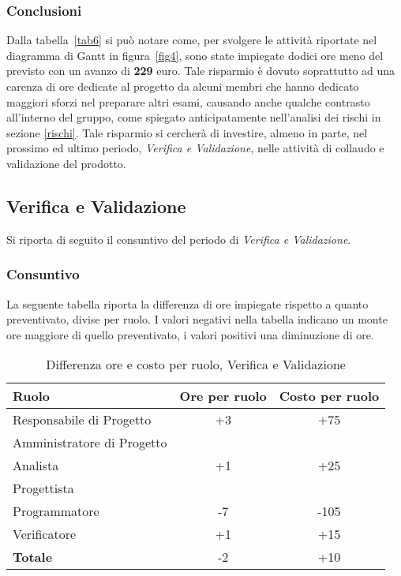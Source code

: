 \subsubsection{Conclusioni}
Dalla tabella~\ref{tab6} si può notare come, per svolgere le attività riportate nel diagramma di \gls{Gantt} in figura~\ref{fig4}, sono state impiegate dodici ore meno del previsto con un avanzo di \textbf{229} euro. Tale risparmio è dovuto soprattutto ad una carenza di ore dedicate al progetto da alcuni membri che hanno dedicato maggiori sforzi nel preparare altri esami, causando anche qualche contrasto all'interno del gruppo, come spiegato anticipatamente nell'analisi dei rischi in sezione \ref{rischi}. Tale risparmio si cercherà di investire, almeno in parte, nel prossimo ed ultimo periodo, \textit{Verifica e Validazione}, nelle attività di collaudo e validazione del prodotto. 

\newpage
\subsection{Verifica e Validazione}
Si riporta di seguito il consuntivo del periodo di \textit{Verifica e Validazione}.

\subsubsection{Consuntivo}
La seguente tabella riporta la differenza di ore impiegate rispetto a quanto preventivato, divise per ruolo. I valori negativi nella tabella indicano un monte ore maggiore di quello preventivato, i valori positivi una diminuzione di ore.

\begin{table}[h]
	\centering
	\begin{tabular}{|l|c|c|}
		\toprule
		\textbf{Ruolo} & \textbf{Ore per ruolo} & \textbf{Costo per ruolo} \\
		
		\midrule
		Responsabile di Progetto & +3 & +75 \\
		Amministratore di Progetto & & \\ 
		Analista & +1 & +25 \\
		Progettista & & \\
		Programmatore & -7 & -105 \\
		Verificatore & +1 & +15 \\
		\midrule
		\textbf{Totale} & -2 & +10 \\
		
		\bottomrule
	\end{tabular}
	\caption{Differenza ore e costo per ruolo, Verifica e Validazione}
	\label{tab7}
\end{table} 

